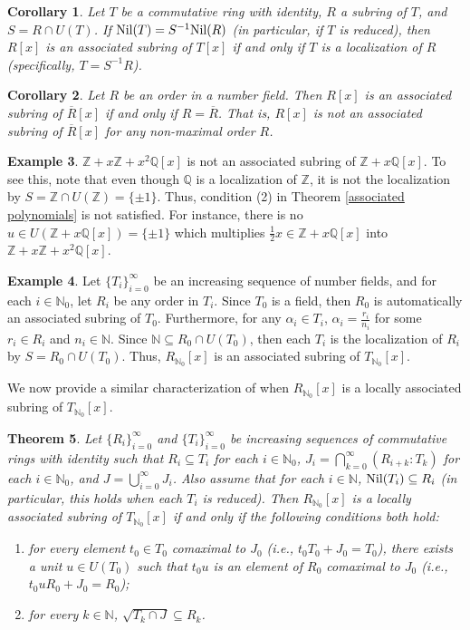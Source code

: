 \documentclass[12pt]{amsart}
\newtheorem{theorem}{Theorem}[section]
\newtheorem{corollary}[theorem]{Corollary}
\theoremstyle{definition}
\newtheorem{example}[theorem]{Example}
\newcommand{\bZ}{\mathbb Z}
\newcommand{\bQ}{\mathbb Q}
\newcommand{\bN}{\mathbb N}
\newcommand{\bNo}{{{\mathbb N}_0}}
\newcommand{\Rbar}{{\overline{R}}}
\newcommand{\Nil}{\textup{Nil}}
\begin{document}
\begin{corollary}
    Let $T$ be a commutative ring with identity, $R$ a subring of $T$, and $S=R\cap U(T)$. If $\Nil(T)=S^{-1}\Nil(R)$ (in particular, if $T$ is reduced), then $R[x]$ is an associated subring of $T[x]$ if and only if $T$ is a localization of $R$ (specifically, $T=S^{-1}R$).
\end{corollary}

\begin{corollary}
    Let $R$ be an order in a number field. Then $R[x]$ is an associated subring of $\Rbar[x]$ if and only if $R=\Rbar$. That is, $R[x]$ is not an associated subring of $\Rbar[x]$ for any non-maximal order $R$.
\end{corollary}

\begin{example}
\label{polynomial not associated}
    $\bZ+x\bZ+x^2\bQ[x]$ is not an associated subring of $\bZ+x\bQ[x]$. To see this, note that even though $\bQ$ is a localization of $\bZ$, it is not the localization by $S=\bZ\cap U(\bZ)=\{\pm 1\}$. Thus, condition (2) in Theorem \ref{associated polynomials} is not satisfied. For instance, there is no $u\in U(\bZ+x\bQ[x])=\{\pm 1\}$ which multiplies $\frac{1}{2}x\in \bZ+x\bQ[x]$ into $\bZ+x\bZ+x^2\bQ[x]$.
\end{example}

\begin{example}
\label{polynomial associated}
    Let $\{T_i\}_{i=0}^\infty$ be an increasing sequence of number fields, and for each $i\in\bNo$, let $R_i$ be any order in $T_i$. Since $T_0$ is a field, then $R_0$ is automatically an associated subring of $T_0$. Furthermore, for any $\alpha_i\in T_i$, $\alpha_i=\frac{r_i}{n_i}$ for some $r_i\in R_i$ and $n_i\in \bN$. Since $\bN\subseteq R_0\cap U(T_0)$, then each $T_i$ is the localization of $R_i$ by $S=R_0\cap U(T_0)$. Thus, $R_\bNo[x]$ is an associated subring of $T_\bNo[x]$. 
\end{example}

We now provide a similar characterization of when $R_\bNo[x]$ is a locally associated subring of $T_\bNo[x]$.

\begin{theorem}
    \label{la polynomial}
    Let $\{R_i\}_{i=0}^\infty$ and $\{T_i\}_{i=0}^\infty$ be increasing sequences of commutative rings with identity such that $R_i\subseteq T_i$ for each $i\in\bNo$, $J_i=\bigcap_{k=0}^\infty (R_{i+k}:T_k)$ for each $i\in\bNo$, and $J=\bigcup_{i=0}^\infty J_i$. Also assume that for each $i\in\bN$, $\Nil(T_i)\subseteq R_i$ (in particular, this holds when each $T_i$ is reduced). Then $R_\bNo[x]$ is a locally associated subring of $T_\bNo[x]$ if and only if the following conditions both hold:
    \begin{enumerate}
        \item for every element $t_0\in T_0$ comaximal to $J_0$ (i.e., $t_0T_0+J_0=T_0$), there exists a unit $u\in U(T_0)$ such that $t_0u$ is an element of $R_0$ comaximal to $J_0$ (i.e., $t_0uR_0+J_0=R_0$);
        \item for every $k\in\bN$, $\sqrt{T_k\cap J}\subseteq R_k$.
    \end{enumerate}
\end{theorem}
\end{document}
